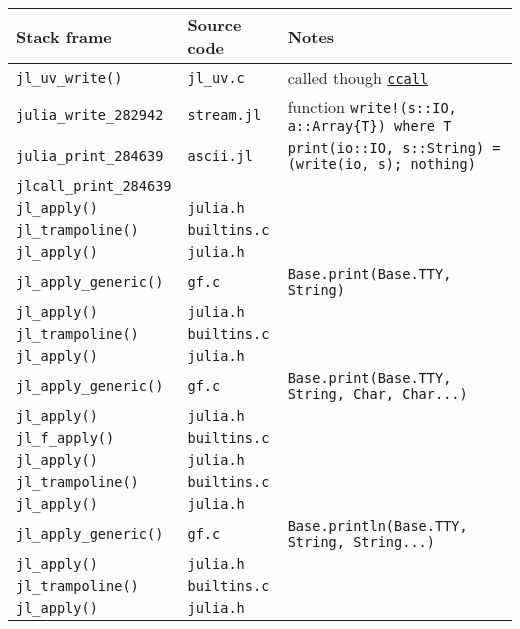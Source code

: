 \begin{table}[h]

\begin{tabulary}{\linewidth}{|L|L|L|}
\hline
Stack frame & Source code & Notes \\
\hline
\texttt{jl\_uv\_write()} & \texttt{jl\_uv.c} & called though \hyperlink{14245046751182637566}{\texttt{ccall}} \\
\hline
\texttt{julia\_write\_282942} & \texttt{stream.jl} & function \texttt{write!(s::IO, a::Array\{T\}) where T} \\
\hline
\texttt{julia\_print\_284639} & \texttt{ascii.jl} & \texttt{print(io::IO, s::String) = (write(io, s); nothing)} \\
\hline
\texttt{jlcall\_print\_284639} &  &  \\
\hline
\texttt{jl\_apply()} & \texttt{julia.h} &  \\
\hline
\texttt{jl\_trampoline()} & \texttt{builtins.c} &  \\
\hline
\texttt{jl\_apply()} & \texttt{julia.h} &  \\
\hline
\texttt{jl\_apply\_generic()} & \texttt{gf.c} & \texttt{Base.print(Base.TTY, String)} \\
\hline
\texttt{jl\_apply()} & \texttt{julia.h} &  \\
\hline
\texttt{jl\_trampoline()} & \texttt{builtins.c} &  \\
\hline
\texttt{jl\_apply()} & \texttt{julia.h} &  \\
\hline
\texttt{jl\_apply\_generic()} & \texttt{gf.c} & \texttt{Base.print(Base.TTY, String, Char, Char...)} \\
\hline
\texttt{jl\_apply()} & \texttt{julia.h} &  \\
\hline
\texttt{jl\_f\_apply()} & \texttt{builtins.c} &  \\
\hline
\texttt{jl\_apply()} & \texttt{julia.h} &  \\
\hline
\texttt{jl\_trampoline()} & \texttt{builtins.c} &  \\
\hline
\texttt{jl\_apply()} & \texttt{julia.h} &  \\
\hline
\texttt{jl\_apply\_generic()} & \texttt{gf.c} & \texttt{Base.println(Base.TTY, String, String...)} \\
\hline
\texttt{jl\_apply()} & \texttt{julia.h} &  \\
\hline
\texttt{jl\_trampoline()} & \texttt{builtins.c} &  \\
\hline
\texttt{jl\_apply()} & \texttt{julia.h} &  \\

\end{tabulary}
\end{table}
